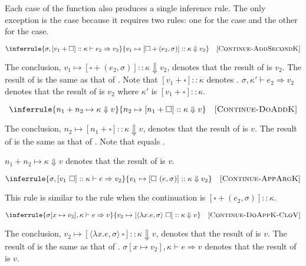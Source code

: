 Each case of the  function also produces a single inference rule.
The only exception is the  case because it requires two rules: one
for the  case and the other for the  case.

\[
  \inferrule
  { \sigma,[v_1+\square]::\kappa\vdash e_2\Rightarrow v_2 }
  { v_1\mapsto[\square+(e_2,\sigma)]::\kappa\Downarrow v_2 }
  \quad\textsc{[Continue-AddSecondK]}
\]

The conclusion, $v_1\mapsto[\square+(e_2,\sigma)]::\kappa\Downarrow v_2$, denotes
that the result of 
is $v_2$. The result of  is the same as that of . Note that $[v_1+\square]::\kappa$ denotes .
$\sigma,\kappa'\vdash e_2\Rightarrow v_2$ denotes that the result of
 is $v_2$ where $\kappa'$ is
$[v_1+\square]::\kappa$.

\[
  \inferrule
  { n_1+n_2\mapsto\kappa\Downarrow v }
  { n_2\mapsto[n_1+\square]::\kappa\Downarrow v }
  \quad\textsc{[Continue-DoAddK]}
\]

The conclusion, $n_2\mapsto[n_1+\square]::\kappa\Downarrow v$, denotes that the
result of  is $v$. The result of  is the same as that of . Note that  equals .

$n_1+n_2\mapsto\kappa\Downarrow v$ denotes that the result of
 is $v$.

\[
  \inferrule
  { \sigma,[v_1\ \square]::\kappa\vdash e\Rightarrow v_2 }
  { v_1\mapsto[\square\ (e,\sigma)]::\kappa\Downarrow v_2 }
  \quad\textsc{[Continue-AppArgK]}
\]

This rule is similar to the rule when the continuation is
$[\square+(e_2,\sigma)]::\kappa$.

\[
  \inferrule
  { \sigma[x\mapsto v_2],\kappa\vdash e\Rightarrow v }
  { v_2\mapsto[\langle\lambda x.e,\sigma\rangle\ \square]::\kappa\Downarrow v }
  \quad\textsc{[Continue-DoAppK-CloV]}
\]

The conclusion, $v_2\mapsto[\langle\lambda x.e,\sigma\rangle\
\square]::\kappa\Downarrow v$, denotes that the result of
 is $v$. The result of
\code{continue(DoAppK(CloV($x$, $e$, $\sigma$), $\kappa$), $v_2$)} is the same as that
of . $\sigma[x\mapsto
v_2],\kappa\vdash e\Rightarrow v$ denotes that the result of \code{interp($e$,
$\sigma[x\mapsto v_2]$, $\kappa$)} is $v$.

